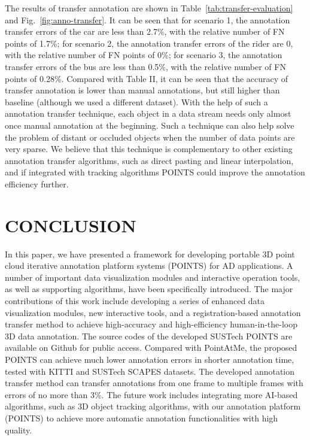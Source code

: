 \documentclass[letterpaper, 10 pt, conference]{ieeeconf}  %
\begin{document}
The results of transfer annotation are shown in Table~\ref{tab:transfer-evaluation} and Fig.~\ref{fig:anno-transfer}.
It can be seen that 
for scenario 1, the annotation transfer errors of the car are less than 2.7\%, with the relative number of FN points of 1.7\%;
for scenario 2, the annotation transfer errors of the rider are 0, with the relative number of FN points of 0\%;
for scenario 3, the annotation transfer errors of the bus are less than 0.5\%, with the relative number of FN points of 0.28\%.  
Compared with Table II, it can be seen that the accuracy of transfer annotation is lower than manual annotations, 
but still higher than baseline (although we used a different dataset).
With the help of such a annotation transfer technique, each object in a data stream needs only almost once manual annotation at the beginning. 
Such a technique can also help solve the problem of distant or occluded objects when the number of data points are very sparse. 
We believe that this technique is complementary to other existing annotation transfer algorithms, such as direct pasting and linear interpolation, 
and if integrated with tracking algorithms POINTS could improve the annotation efficiency further.




\section{CONCLUSION}
\label{sec:conclusions}

In this paper, we have presented a framework for developing portable 3D point cloud iterative annotation platform systems (POINTS) for AD applications. 
A number of important data visualization modules and interactive operation tools, as well as supporting algorithms, have been specifically introduced.
The major contributions of this work include developing a series of enhanced data visualization modules, new interactive tools, and a registration-based annotation transfer method to achieve high-accuracy and high-efficiency human-in-the-loop 3D data annotation.
The source codes of the developed SUSTech POINTS are available on Github for public access.
Compared with PointAtMe, the proposed POINTS can achieve much lower annotation errors in shorter annotation time, tested with KITTI and SUSTech SCAPES datasets. 
The developed annotation transfer method can transfer annotations from one frame to multiple frames with errors of no more than 3\%.
The future work includes integrating more AI-based algorithms, such as 3D object tracking algorithms, with our annotation platform (POINTS) to achieve more automatic annotation functionalities with high quality.
\end{document}
